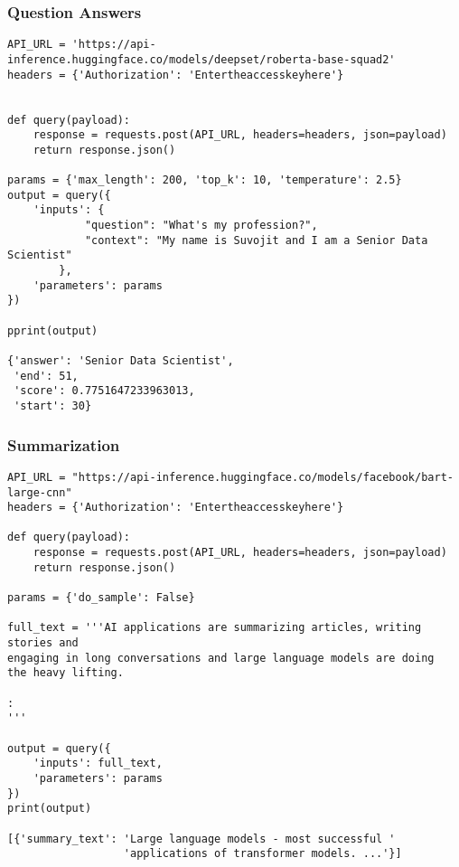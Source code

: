 \begin{frame}[fragile]\frametitle{Question Answers}


\begin{lstlisting}
API_URL = 'https://api-inference.huggingface.co/models/deepset/roberta-base-squad2'
headers = {'Authorization': 'Entertheaccesskeyhere'}


def query(payload):
    response = requests.post(API_URL, headers=headers, json=payload)
    return response.json()
  
params = {'max_length': 200, 'top_k': 10, 'temperature': 2.5}
output = query({
    'inputs': {
            "question": "What's my profession?",
            "context": "My name is Suvojit and I am a Senior Data Scientist"
        },
    'parameters': params
})

pprint(output)

{'answer': 'Senior Data Scientist',
 'end': 51,
 'score': 0.7751647233963013,
 'start': 30}
\end{lstlisting}


\end{frame}


\begin{frame}[fragile]\frametitle{Summarization}


\begin{lstlisting}
API_URL = "https://api-inference.huggingface.co/models/facebook/bart-large-cnn"
headers = {'Authorization': 'Entertheaccesskeyhere'}

def query(payload):
    response = requests.post(API_URL, headers=headers, json=payload)
    return response.json()
    
params = {'do_sample': False}

full_text = '''AI applications are summarizing articles, writing stories and 
engaging in long conversations and large language models are doing 
the heavy lifting.

:
'''

output = query({
    'inputs': full_text,
    'parameters': params
})
print(output)

[{'summary_text': 'Large language models - most successful '
                  'applications of transformer models. ...'}]
\end{lstlisting}


\end{frame}

